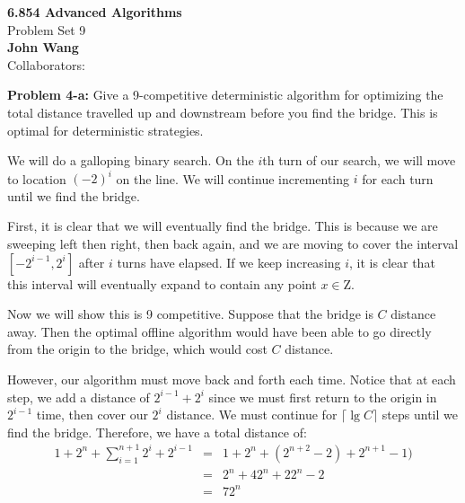\documentclass[psamsfonts]{amsart}
\newenvironment{sol}{\vspace{0.25cm}{\large \bfseries Solution:}}{\qedsymbol}
\newenvironment{prob}[1]{\begin{framed}{\large \bfseries Problem #1:}}{\end{framed}}
\newcommand{\makenewtitle}{
    \begin{center}
    {\huge \bfseries 6.854 Advanced Algorithms} \\
    Problem Set 9\\
    \vspace{0.25cm}
    {\bfseries John Wang} \\
    Collaborators:  
    \end{center}
    \vspace{0.5cm}
}
\begin{document}
\newpage
\makenewtitle

\begin{prob}{4-a}
Give a 9-competitive deterministic algorithm for optimizing the total distance travelled up and downstream before you find the bridge. This is optimal for deterministic strategies.
\end{prob}

\begin{sol}
We will do a galloping binary search. On the $i$th turn of our search, we will move to location $(-2)^{i}$ on the line. We will continue incrementing $i$ for each turn until we find the bridge. 

First, it is clear that we will eventually find the bridge. This is because we are sweeping left then right, then back again, and we are moving to cover the interval $[-2^{i-1}, 2^{i}]$ after $i$ turns have elapsed. If we keep increasing $i$, it is clear that this interval will eventually expand to contain any point $x \in \mathrm{Z}$. 

Now we will show this is 9 competitive. Suppose that the bridge is $C$ distance away. Then the optimal offline algorithm would have been able to go directly from the origin to the bridge, which would cost $C$ distance. 

However, our algorithm must move back and forth each time. Notice that at each step, we add a distance of $2^{i-1} + 2^i$ since we must first return to the origin in $2^{i-1}$ time, then cover our $2^i$ distance. We must continue for $\lceil \lg C \rceil$ steps until we find the bridge. Therefore, we have a total distance of:
\begin{eqnarray}
1 + 2^n + \sum_{i=1}^{n+1} 2^{i} + 2^{i-1} &=& 1 + 2^n + (2^{n+2} - 2) + 2^{n+1} -1) \\
&=& 2^n + 4 2^n + 2 2^n - 2 \\
&=& 7 2^n
\end{eqnarray}
\end{sol}
\end{document}
